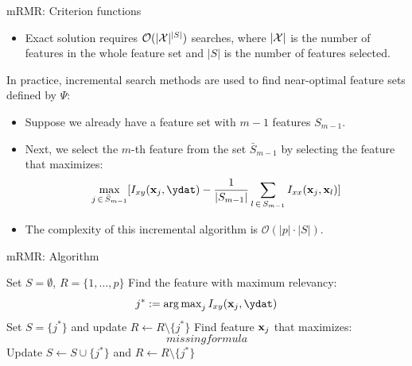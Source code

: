 \documentclass[11pt,compress,t,notes=noshow, xcolor=table]{beamer}
\begin{document}
\begin{vbframe}{\MakeLowercase{M}RMR: Criterion functions}
\begin{itemize}
  \item Exact solution requires $ \mathcal{O} (|\mathcal{X}|^{|S|})$ searches, where $|\mathcal{X}|$ is the number of features in the whole feature set and $|S|$ is the number of features selected.
  \end{itemize}
  In practice, incremental search methods are used to find near-optimal feature sets defined by $\Psi$:
  \begin{itemize}
  \item Suppose we already have a feature set with $m-1$ features $S_{m-1}$.
  \item Next, we select the $m$-th feature from the set $\bar{S}_{m-1}$ by selecting the feature that maximizes:
  $$\max_{j \, \in \, \bar{S}_{m-1}} [ I_{xy} (\xj, \ydat) - \frac{1}{|S_{m-1}|} \sum_{l \, \in \, S_{m-1}} I_{xx}(\xj, \xl)  ]$$
  \item The complexity of this incremental algorithm is $\mathcal{O}(|p| \cdot| S|)$.
  \end{itemize}
  \end{vbframe}

  \begin{vbframe}{\MakeLowercase{m}RMR: Algorithm}

  \begin{algorithm}[H]
  \footnotesize
    \begin{algorithmic}[1]
      \State Set $S = \emptyset$, $R = \{ 1, \dots, p \}$
      \State Find the feature with maximum relevancy:
      $$j^* := \argmax_{j} I_{xy} (\xj, \ydat)$$
      \State Set $S = \{ j^* \}$ and update $R \leftarrow R \setminus \{j^* \}$
      \Repeat
        \State Find feature $\mathbf{x}_j$ that maximizes:
        $$missing formula$$%
        \State Update $S \leftarrow S \cup \{j^* \}$ and $R \leftarrow R \setminus \{ j^* \}$
      \caption{mRMR algorithm}
    \end{algorithmic}
  \end{algorithm}
  \end{vbframe}
\end{document}
